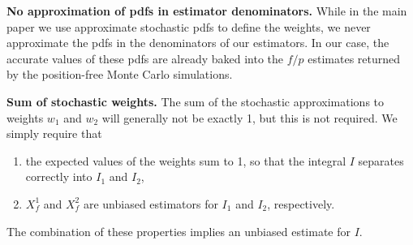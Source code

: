 {\bf No approximation of pdfs in estimator denominators.} While in the main paper we use approximate stochastic pdfs to define the weights, we never approximate the pdfs in the denominators of our estimators. In our case, the accurate values of these pdfs are already baked into the $f/p$ estimates returned by the position-free Monte Carlo simulations.

{\bf Sum of stochastic weights.} The sum of the stochastic approximations to weights $w_1$ and $w_2$ will generally not be exactly 1, but this is not required. We simply require that
\begin{enumerate}
	\item the expected values of the weights sum to 1, so that the integral $I$ separates correctly into $I_1$ and $I_2$,
	\item $X_f^1$ and $X_f^2$ are unbiased estimators for $I_1$ and $I_2$, respectively.
\end{enumerate}
The combination of these properties implies an unbiased estimate for $I$.
